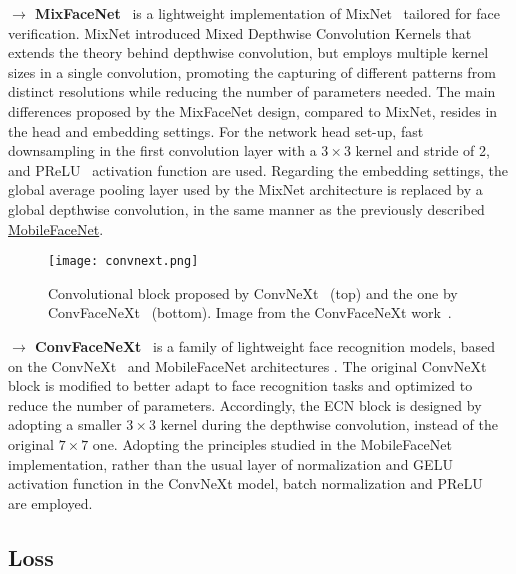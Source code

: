 \documentclass[class=report, crop=false, a4paper, 12pt]{standalone}
\begin{document}
\noindent\textbf{$\rightarrow$ MixFaceNet}~\autocite{boutrosMixFaceNetsExtremelyEfficient2021} is a lightweight implementation of MixNet~\autocite{tanMixConvMixedDepthwise} tailored for face verification. MixNet introduced Mixed Depthwise Convolution Kernels  that extends the theory behind depthwise convolution, but employs multiple kernel sizes in a single convolution, promoting the capturing of different patterns from distinct resolutions while reducing the number of parameters needed. The main differences proposed by the MixFaceNet design, compared to MixNet, resides in the head and embedding settings. For the network head set-up, fast downsampling in the first convolution layer with a $3\times3$ kernel and stride of 2, and PReLU~\autocite{heDelvingDeepRectifiers2015} activation function are used. Regarding the embedding settings, the global average pooling layer used by the MixNet architecture is replaced by a global depthwise convolution, in the same manner as the previously described \hyperref[mobilefacenet]{MobileFaceNet}.

\begin{figure}[H]
    \centering
    \texttt{[image: convnext.png]}
    \caption[Convolutional block proposed by ConvNeXt and the one by ConvFaceNeXt.]{Convolutional block proposed by ConvNeXt~\autocite{liuConvNet2020s2022} (top) and the one by ConvFaceNeXt~\autocite{hooConvFaceNeXtLightweightNetworks2022} (bottom). Image from the ConvFaceNeXt work~\autocite{hooConvFaceNeXtLightweightNetworks2022}.}
    \label{fig:convnext}
\end{figure}

\noindent\textbf{$\rightarrow$ ConvFaceNeXt}~\autocite{hooConvFaceNeXtLightweightNetworks2022} is a family of lightweight face recognition models, based on the ConvNeXt~\autocite{liuConvNet2020s2022} and MobileFaceNet architectures . The original ConvNeXt block is modified to better adapt to face recognition tasks and optimized to reduce the number of parameters. Accordingly, the \gls{ECN} block is designed by adopting a smaller $3\times3$ kernel during the depthwise convolution, instead of the original $7\times7$ one. Adopting the principles studied in the MobileFaceNet implementation, rather than the usual layer of normalization and \gls{GELU} activation function in the ConvNeXt model, batch normalization and PReLU~\autocite{heDelvingDeepRectifiers2015} are employed. 

\subsection{Loss}
\end{document}
